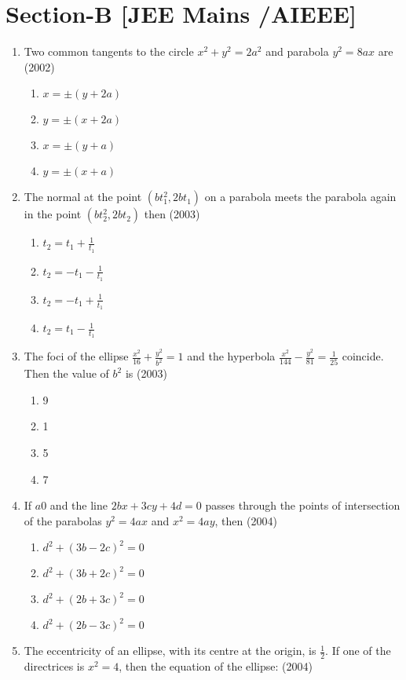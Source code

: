 \documentclass[12pt]{article}
\begin{document}
\section*{Section-B    [JEE Mains /AIEEE]}


\begin{enumerate}
\item Two common tangents to the circle $x^2+y^2=2a^2$ and parabola $y^2=8ax$ are (2002)
\begin{enumerate}
\item $x=\pm(y+2a)$
\item $y=\pm(x+2a)$
\item $x=\pm(y+a)$
\item $y=\pm(x+a)$
\end{enumerate}
\item The normal at the point $(bt_1^2,2bt_1)$ on a parabola meets the parabola again in the point $(bt_2^2,2bt_2)$ then (2003)
\begin{enumerate}
\item $t_2=t_1+\frac{1}{t_1}$
\item $t_2=-t_1-\frac{1}{t_1}$
\item $t_2=-t_1+\frac{1}{t_1}$
\item $t_2=t_1-\frac{1}{t_1}$
\end{enumerate}
\item The foci of the ellipse $\frac{x^2}{16}+\frac{y^2}{b^2}=1$ and the hyperbola $\frac{x^2}{144}-\frac{y^2}{81}=\frac{1}{25}$ coincide. Then the value of $b^2$ is (2003)
\begin{enumerate}
\item 9
\item 1
\item 5
\item 7
\end{enumerate}
\item If $a0$ and the line $2bx+3cy+4d=0$ passes through the points of intersection of the parabolas $y^2=4ax$ and $x^2=4ay$, then (2004)
\begin{enumerate}
\item $d^2+(3b-2c)^2=0$
\item $d^2+(3b+2c)^2=0$ 
\item $d^2+(2b+3c)^2=0$ 
\item $d^2+(2b-3c)^2=0$ 
\end{enumerate}
\item The eccentricity of an ellipse, with its centre at the origin, is $\frac{1}{2}$. If one of the directrices is $x^2=4$, then the equation of the ellipse: (2004)

\end{enumerate}
\end{document}
